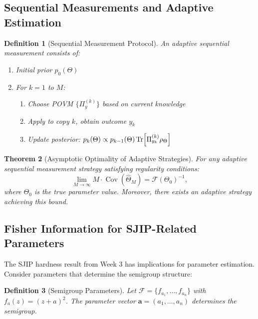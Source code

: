 \documentclass[12pt]{article}
\newtheorem{theorem}{Theorem}[section]
\newtheorem{definition}[theorem]{Definition}
\newcommand{\Cov}{\operatorname{Cov}}
\begin{document}
\subsection{Sequential Measurements and Adaptive Estimation}

\begin{definition}[Sequential Measurement Protocol]
An adaptive sequential measurement consists of:
\begin{enumerate}
    \item Initial prior \(p_0(\Theta)\)
    \item For \(k = 1\) to \(M\):
    \begin{enumerate}
        \item Choose POVM \(\{\Pi_y^{(k)}\}\) based on current knowledge
        \item Apply to copy \(k\), obtain outcome \(y_k\)
        \item Update posterior: \(p_k(\Theta) \propto p_{k-1}(\Theta) \Tr[\Pi_{y_k}^{(k)} \rho_\Theta]\)
    \end{enumerate}
\end{enumerate}
\end{definition}

\begin{theorem}[Asymptotic Optimality of Adaptive Strategies]
For any adaptive sequential measurement strategy satisfying regularity conditions:
\begin{equation}
    \lim_{M\to\infty} M \cdot \Cov(\hat{\Theta}_M) = \mathcal{F}(\Theta_0)^{-1},
\end{equation}
where \(\Theta_0\) is the true parameter value. Moreover, there exists an adaptive strategy achieving this bound.
\end{theorem}

\subsection{Fisher Information for SJIP-Related Parameters}

The SJIP hardness result from Week 3 has implications for parameter estimation. Consider parameters that determine the semigroup structure:

\begin{definition}[Semigroup Parameters]
Let \(\mathcal{F} = \{f_{a_1}, \dots, f_{a_n}\}\) with \(f_a(z) = (z+a)^2\). The parameter vector \(\mathbf{a} = (a_1,\dots,a_n)\) determines the semigroup.
\end{definition}
\end{document}

